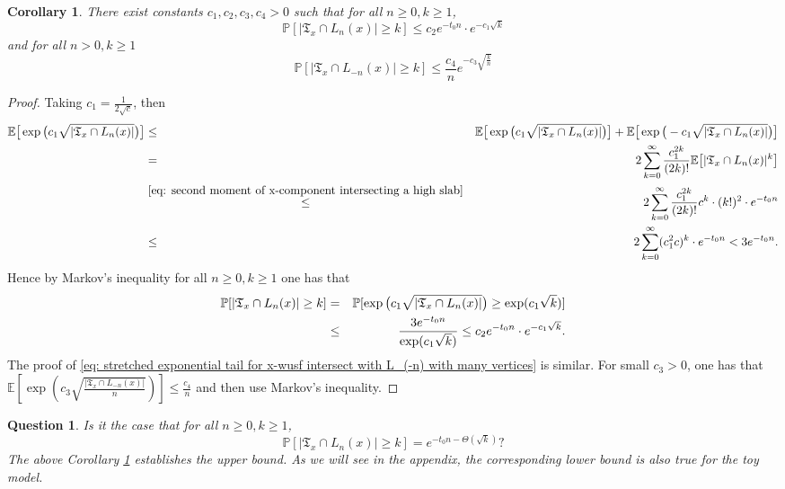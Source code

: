 \documentclass[12pt]{article}
\newtheorem{corollary}[theorem]{Corollary}
\newtheorem{question}[theorem]{Question}
\numberwithin{equation}{section}
\newcommand{\be}{\begin{equation}}
\newcommand{\ee}{\end{equation}}
\newcommand{\1}{\mathbf{1}}
\begin{document}
 \begin{corollary}\label{cor: tail probability for x-wusf intersect with L_n with many vertices}
 	There exist  constants $c_1,c_2,c_3,c_4>0$ such that for all $n\geq0,k\geq1$,
 	\be\label{eq: stretched exponential tail for x-wusf intersect with L_n with many vertices}
 	\mathbb{P}[|\mathfrak{T}_x\cap L_n(x)|\geq k]\leq c_2e^{-t_0n}\cdot e^{-c_1\sqrt{k}}
 	\ee
 	and for all $n>0,k\geq1$
 	\be\label{eq: stretched exponential tail for x-wusf intersect with L_(-n) with many vertices}
 	\mathbb{P}[|\mathfrak{T}_x\cap L_{-n}(x)|\geq k]\leq \frac{c_4}{n}e^{-c_3\sqrt{\frac{k}{n}}}
 	\ee
 	
 \end{corollary}
\begin{proof}
	Taking $c_1=\frac{1}{2\sqrt{c}}$, then
	\begin{eqnarray}
	\mathbb{E}\big[\exp\big(c_1\sqrt{|\mathfrak{T}_x\cap L_n(x)|}\big)\big]&\leq 
	&\mathbb{E}\big[\exp\big(c_1\sqrt{|\mathfrak{T}_x\cap L_n(x)|}\big)\big]+\mathbb{E}\big[\exp\big(-c_1\sqrt{|\mathfrak{T}_x\cap L_n(x)|}\big)\big]\nonumber\\
	&=&2\sum_{k=0}^{\infty}\frac{c_1^{2k}}{(2k)!}\mathbb{E}\big[|\mathfrak{T}_x\cap L_n(x)|^k\big]\nonumber\\
	&\stackrel{\eqref{eq: second moment of x-component intersecting a high slab}}{\leq}&
	2\sum_{k=0}^{\infty}\frac{c_1^{2k}}{(2k)!} c^k \cdot (k!)^2\cdot e^{-t_0n}\nonumber\\
	&\leq&2\sum_{k=0}^{\infty}(c_1^2c)^k\cdot e^{-t_0n}<  3e^{-t_0n}.
	\end{eqnarray}
	Hence by Markov's inequality  for all $n\geq0,k\geq1$ one has that 
	\begin{eqnarray*}
	\mathbb{P}[|\mathfrak{T}_x\cap L_n(x)|\geq k]&=&\mathbb{P}[\exp\big(c_1\sqrt{|\mathfrak{T}_x\cap L_n(x)|}\big)\geq \exp(c_1\sqrt{k})]\\
	&\leq& \frac{3e^{-t_0n}}{\exp(c_1\sqrt{k})}\leq c_2e^{-t_0n}\cdot e^{-c_1\sqrt{k}}.\qedhere
	\end{eqnarray*}
The proof of \eqref{eq: stretched exponential tail for x-wusf intersect with L_(-n) with many vertices} is similar. For small $c_3>0$, one has that  $\mathbb{E}[\exp(c_3\sqrt{\frac{|\mathfrak{T}_x\cap L_{-n}(x)|}{n}})]\leq \frac{c_4}{n}$ and then use Markov's inequality. 
\end{proof}
\begin{question}
	Is it the case that for all $n\geq0,k\geq1$,
	\[
		\mathbb{P}[|\mathfrak{T}_x\cap L_n(x)|\geq k]=e^{-t_0n-\Theta(\sqrt{k})}?
	\]
	The above Corollary \ref{cor: tail probability for x-wusf intersect with L_n with many vertices} establishes the upper bound. As we will see in the appendix, the corresponding lower bound is also true for the toy model. 
\end{question}
 
\end{document}
